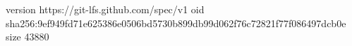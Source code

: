 version https://git-lfs.github.com/spec/v1
oid sha256:9ef949fd71e625386e0506bd5730b899db99d062f76c72821f77f086497dcb0e
size 43880
